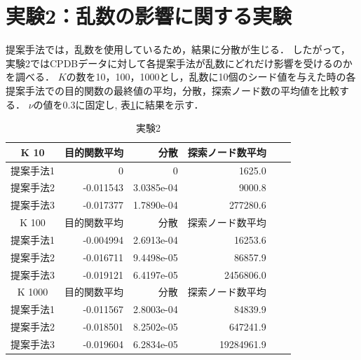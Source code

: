 \section{実験2：乱数の影響に関する実験}
提案手法では，乱数を使用しているため，結果に分散が生じる．
したがって，実験2ではCPDBデータに対して各提案手法が乱数にどれだけ影響を受けるのかを調べる．
$K$の数を10，100，1000とし，乱数に10個のシード値を与えた時の各提案手法での目的関数の最終値の平均，分散，探索ノード数の平均値を比較する．
$\nu$の値を0.3に固定し,
表\ref{randomseed}に結果を示す．
\begin{table}[t]
	\centering
	\begin{tabular}{|c|r|r|r|r|r|}
		\hline
		K 10 & 目的関数平均 & 分散 & 探索ノード数平均 \\
		\hline \hline
		提案手法1  & 0 & 0 & 1625.0 \\
		\hline
		提案手法2  & -0.011543 & 3.0385e-04 & 9000.8 \\
		\hline
		提案手法3  & -0.017377 & 1.7890e-04 & 277280.6 \\
		\hline
		\hline
		K 100 & 目的関数平均 & 分散 & 探索ノード数平均 \\
		\hline \hline
		提案手法1  & -0.004994 & 2.6913e-04 & 16253.6 \\
		\hline
		提案手法2  & -0.016711 & 9.4498e-05 & 86857.9 \\
		\hline
		提案手法3  & -0.019121 & 6.4197e-05 & 2456806.0 \\
		\hline
		\hline
		K 1000 & 目的関数平均 & 分散 & 探索ノード数平均 \\
		\hline \hline
		提案手法1  & -0.011567 & 2.8003e-04 & 84839.9 \\
		\hline
		提案手法2  & -0.018501 & 8.2502e-05 & 647241.9 \\
		\hline
		提案手法3  & -0.019604 & 6.2834e-05 & 19284961.9 \\
		\hline
	\end{tabular}
	\caption{実験2}
	\label{randomseed}
\end{table}


